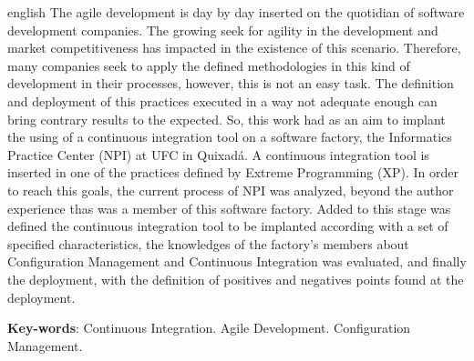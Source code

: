 \begin{resumo}[Abstract]
 \begin{otherlanguage*}{english}
The agile development is day by day inserted on the quotidian of software development companies. The growing seek for agility in the development and market competitiveness has impacted in the existence of this scenario. Therefore, many companies seek to apply the defined methodologies in this kind of development	in their processes, however, this is not an easy task. The definition and deployment of this practices executed in a way not adequate enough can bring contrary results to the expected. So, this work had as an aim to implant the using of a continuous integration tool on a software factory, the Informatics Practice Center (NPI) at UFC in Quixadá. A continuous integration tool is inserted in one of the practices defined by Extreme Programming (XP). In order to reach this goals, the current process of NPI was analyzed, beyond the author experience thas was a member of this software factory. Added to this stage was defined the continuous integration tool to be implanted according with a set of specified characteristics, the knowledges of the factory's members about Configuration Management and Continuous Integration was evaluated, and finally the deployment, with the definition of positives and negatives points found at the deployment.

   \vspace{\onelineskip}
 
   \noindent 
   \textbf{Key-words}: Continuous Integration. Agile Development. Configuration Management.
 \end{otherlanguage*}
\end{resumo}